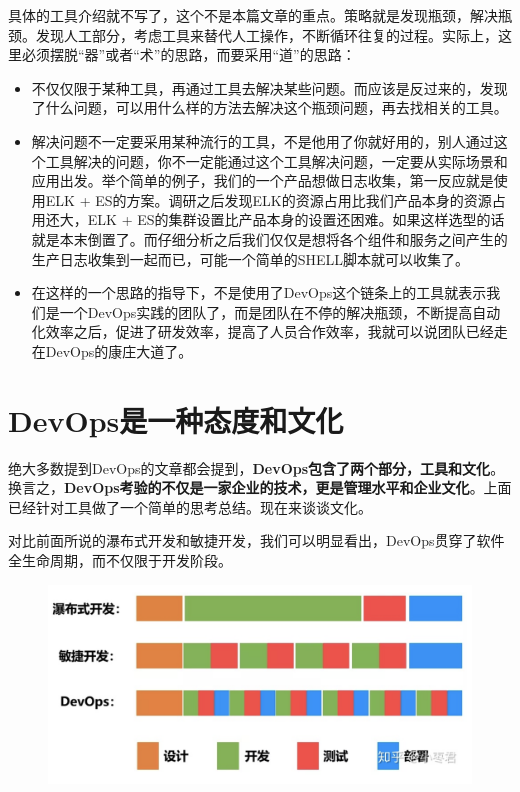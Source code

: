 \documentclass[12pt]{article}
\begin{document}
具体的工具介绍就不写了，这个不是本篇文章的重点。策略就是发现瓶颈，解决瓶颈。发现人工部分，考虑工具来替代人工操作，不断循环往复的过程。实际上，这里必须摆脱“器”或者“术”的思路，而要采用“道”的思路：

\begin{itemize}
\setlength{\itemsep}{0pt}
\setlength{\parsep}{0pt}
\setlength{\parskip}{0pt}
    \item 不仅仅限于某种工具，再通过工具去解决某些问题。而应该是反过来的，发现了什么问题，可以用什么样的方法去解决这个瓶颈问题，再去找相关的工具。

    \item 解决问题不一定要采用某种流行的工具，不是他用了你就好用的，别人通过这个工具解决的问题，你不一定能通过这个工具解决问题，一定要从实际场景和应用出发。举个简单的例子，我们的一个产品想做日志收集，第一反应就是使用ELK + ES的方案。调研之后发现ELK的资源占用比我们产品本身的资源占用还大，ELK + ES的集群设置比产品本身的设置还困难。如果这样选型的话就是本末倒置了。而仔细分析之后我们仅仅是想将各个组件和服务之间产生的生产日志收集到一起而已，可能一个简单的SHELL脚本就可以收集了。
    
    \item 在这样的一个思路的指导下，不是使用了DevOps这个链条上的工具就表示我们是一个DevOps实践的团队了，而是团队在不停的解决瓶颈，不断提高自动化效率之后，促进了研发效率，提高了人员合作效率，我就可以说团队已经走在DevOps的康庄大道了。
\end{itemize}

\section{DevOps是一种态度和文化}
绝大多数提到DevOps的文章都会提到，\textbf{DevOps包含了两个部分，工具和文化}。换言之，\textbf{DevOps考验的不仅是一家企业的技术，更是管理水平和企业文化}。上面已经针对工具做了一个简单的思考总结。现在来谈谈文化。

对比前面所说的瀑布式开发和敏捷开发，我们可以明显看出，DevOps贯穿了软件全生命周期，而不仅限于开发阶段。

\begin{figure}[H]
    \centering
    \includegraphics[width=.6\textwidth]{fig/DevOps_Waterfall_vs_Agile_vs_DevOps.png}
\end{figure}
\end{document}
